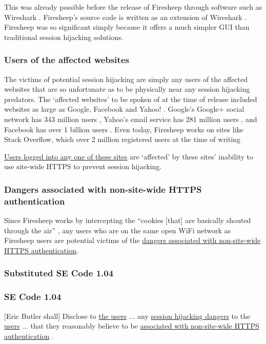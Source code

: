 \documentclass[11pt]{article}
\begin{document}
\begin{multicols}{2}
This was already possible before the release of Firesheep through software such as Wireshark \cite{wireshark}. Firesheep's source code is written as an extension of Wireshark \cite{firesheep-source}. Firesheep was so significant simply because it offers a much simpler GUI than traditional session hijacking solutions. 

\subsubsection*{Users of the affected websites}
The victims of potential session hijacking are simply any users of the affected websites that are so unfortunate as to be physically near any session hijacking predators. The `affected websites' to be spoken of at the time of release included websites as large as Google, Facebook and Yahoo! \cite{firesheep-source}. Google's Google+ social network has 343 million users \cite{google-stats}, Yahoo's email service has 281 million users \cite{yahoo-stats}, and Facebook has over 1 billion users \cite{facebook-stats}. Even today, Firesheep works on sites like Stack Overflow, which over 2 million registered users at the time of writing \cite{stack-overflow-stats}

\uline{Users logged into any one of these sites} are `affected' by these sites' inability to use site-wide HTTPS to prevent session hijacking.

\subsubsection*{Dangers associated with non-site-wide HTTPS authentication}
Since Firesheep works by intercepting the ``cookies [that] are basically shouted through the air'' \cite{eric-butler}, any users who are on the same open WiFi network as Firesheep users are potential victims of the \uline{dangers associated with non-site-wide HTTPS authentication}.

\subsubsection*{Substituted SE Code 1.04}
\subsubsection*{SE Code 1.04}
[Eric Butler shall] Disclose to \uline{the users} ... any \uline{session hijacking dangers} to the \uline{users} ... that they reasonably believe to be \uline{associated with non-site-wide HTTPS authentication} \cite{se-code}. 


\end{multicols}
\end{document}
